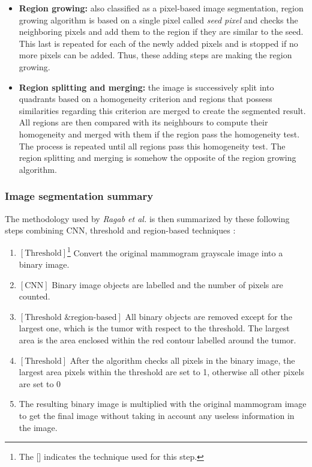 \documentclass[11pt, openany]{report}
\theoremstyle{plain}
\theoremstyle{definition}
\theoremstyle{remark}
\begin{document}
\begin{itemize}
\item \textbf{Region growing:} also classified as a pixel-based image segmentation, region growing algorithm is based on a single pixel called \textit{seed pixel} and checks the neighboring pixels and add them to the region if they are similar to the seed. This last is repeated for each of the newly added pixels and is stopped if no more pixels can be added. Thus, these adding steps are making the region growing. 

\item \textbf{Region splitting and merging:} the image is successively split into quadrants based on a homogeneity criterion and regions that possess similarities regarding this criterion are merged to create the segmented result. All regions are then compared with its neighbours to compute their homogeneity and merged with them if the region pass the homogeneity test. The process is repeated until all regions pass this homogeneity test. The region splitting and merging is somehow the opposite of the region growing algorithm. 
\end{itemize} 

\subsubsection{Image segmentation summary}
The methodology used by \textit{Ragab et al.} is then summarized by these following steps combining CNN, threshold and region-based techniques \cite{breast-cancer}: 
\begin{enumerate}
\item $\left[\text{Threshold}\right]$\footnote{The [] indicates the technique used for this step.} Convert the original mammogram grayscale image into a binary image. 
\item $\left[\text{CNN}\right]$ Binary image objects are labelled and the number of pixels are counted. 
\item $\left[\text{Threshold \& region-based}\right]$ All binary objects are removed except for the largest one, which is the tumor with respect to the threshold. The largest area is the area enclosed within the red contour labelled around the tumor. 
\item $\left[\text{Threshold}\right]$ After the algorithm checks all pixels in the binary image, the largest area pixels within the threshold are set to 1, otherwise all other pixels are set to 0
\item The resulting binary image is multiplied with the original mammogram image to get
the final image without taking in account any useless information in the image.
\end{enumerate}
\end{document}
